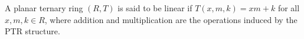 A planar ternary ring $(R, T)$ is said to be linear if $T(x, m, k) = xm + k$ for all $x, m, k \in R$, where addition and multiplication are the operations induced by the PTR structure.
